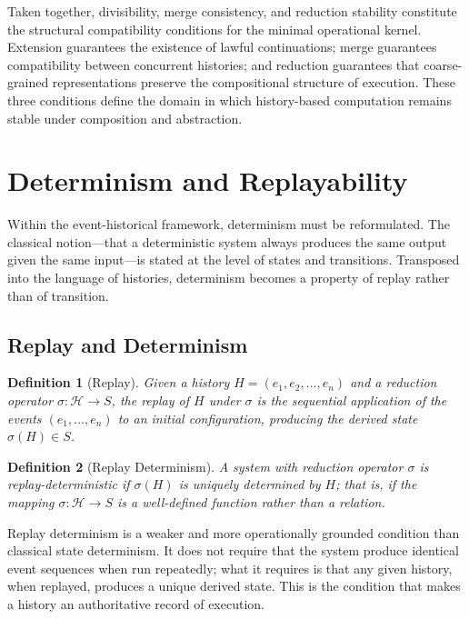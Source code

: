 \documentclass[12pt]{article}
\newtheorem{definition}{Definition}
\begin{document}
Taken together, divisibility, merge consistency, and reduction stability constitute the
structural compatibility conditions for the minimal operational kernel. Extension guarantees
the existence of lawful continuations; merge guarantees compatibility between concurrent
histories; and reduction guarantees that coarse-grained representations preserve the
compositional structure of execution. These three conditions define the domain in which
history-based computation remains stable under composition and abstraction.

\section{Determinism and Replayability}
\label{sec:determinism}

Within the event-historical framework, determinism must be reformulated. The classical
notion---that a deterministic system always produces the same output given the same input---is
stated at the level of states and transitions. Transposed into the language of histories,
determinism becomes a property of replay rather than of transition.

\subsection{Replay and Determinism}

\begin{definition}[Replay]
Given a history $H = (e_1, e_2, \ldots, e_n)$ and a reduction operator
$\sigma : \mathcal{H} \rightarrow S$, the \emph{replay} of $H$ under $\sigma$ is the
sequential application of the events $(e_1, \ldots, e_n)$ to an initial configuration,
producing the derived state $\sigma(H) \in S$.
\end{definition}

\begin{definition}[Replay Determinism]
A system with reduction operator $\sigma$ is \emph{replay-deterministic} if $\sigma(H)$ is
uniquely determined by $H$; that is, if the mapping $\sigma : \mathcal{H} \rightarrow S$ is a
well-defined function rather than a relation.
\end{definition}

Replay determinism is a weaker and more operationally grounded condition than classical state
determinism. It does not require that the system produce identical event sequences when run
repeatedly; what it requires is that any given history, when replayed, produces a unique derived
state. This is the condition that makes a history an authoritative record of execution.
\end{document}
